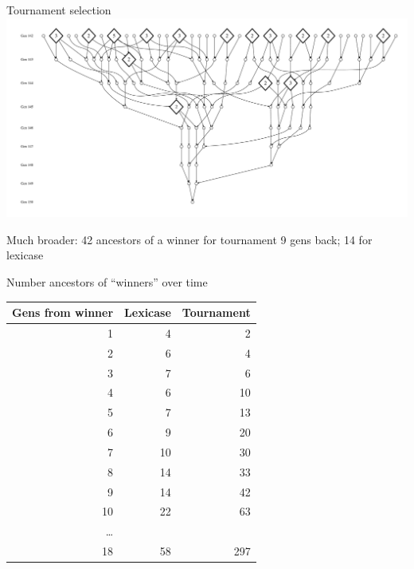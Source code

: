 \documentclass{beamer}
\begin{document}
\begin{frame}{Tournament selection}
	\includegraphics[width=\linewidth]{Figures/ancestors_of_winner_rswn_tourney_run74_9gens}
	
	Much broader: 42 ancestors of a winner for tournament 9 gens back; 14 for lexicase
\end{frame}

\begin{frame}{Number ancestors of ``winners'' over time}
		\begin{center}
			\begin{tabular}{rrr}
				Gens from winner & Lexicase & Tournament \\
				\hline\noalign{\smallskip}                
                1 & 4 & 2 \\
                2 & 6 & 4 \\
                3 & 7 & 6 \\
                4 & 6 & 10 \\
                5 & 7 & 13 \\
                6 & 9 & 20 \\
                7 & 10 & 30 \\
                8 & 14 & 33 \\
                9 & 14 & 42 \\
                10 & 22 & 63 \\ 
                \ldots \\ 
                18 & 58 & 297 \\
			\end{tabular}
		\end{center}
\end{frame}
\end{document}
